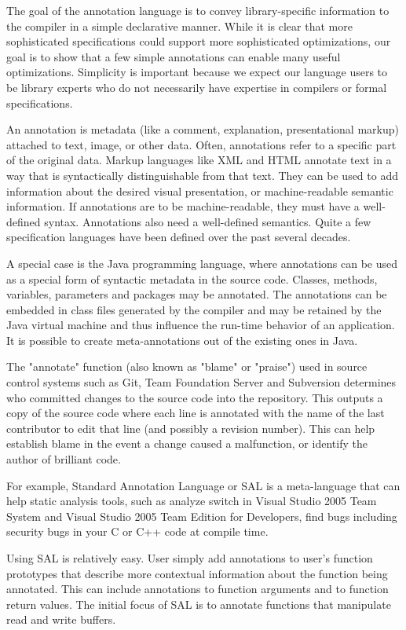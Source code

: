 The goal of the annotation language is to convey library-specific information to the compiler in a simple declarative manner. While it is clear that more sophisticated specifications could support more sophisticated optimizations, our goal is to show that a few simple annotations can enable many useful optimizations. Simplicity is important because we expect our language users to be library experts who do not necessarily have expertise in compilers or formal specifications.

An annotation is metadata (like a comment, explanation, presentational markup) attached to text, image, or other data. Often, annotations refer to a specific part of the original data. Markup languages like XML and HTML annotate text in a way that is syntactically distinguishable from that text. They can be used to add information about the desired visual presentation, or machine-readable semantic information. If annotations are to be machine-readable, they must have a well-defined syntax. Annotations also need a well-defined semantics. Quite a few specification languages have been defined over the past several decades. 

A special case is the Java programming language, where annotations can be used as a special form of syntactic metadata in the source code. Classes, methods, variables, parameters and packages may be annotated. The annotations can be embedded in class files generated by the compiler and may be retained by the Java virtual machine and thus influence the run-time behavior of an application. It is possible to create meta-annotations out of the existing ones in Java.

The "annotate" function (also known as "blame" or "praise") used in source control systems such as Git, Team Foundation Server and Subversion determines who committed changes to the source code into the repository. This outputs a copy of the source code where each line is annotated with the name of the last contributor to edit that line (and possibly a revision number). This can help establish blame in the event a change caused a malfunction, or identify the author of brilliant code.

For example, Standard Annotation Language or SAL \cite{ref_51_microsoft:sal} is a meta-language that can help static analysis tools, such as analyze switch in Visual Studio 2005 Team System and Visual Studio 2005 Team Edition for Developers, find bugs including security bugs in your C or C++ code at compile time.

Using SAL is relatively easy. User simply add annotations to user's function prototypes that describe more contextual information about the function being annotated. This can include annotations to function arguments and to function return values. The initial focus of SAL is to annotate functions that manipulate read and write buffers. 


